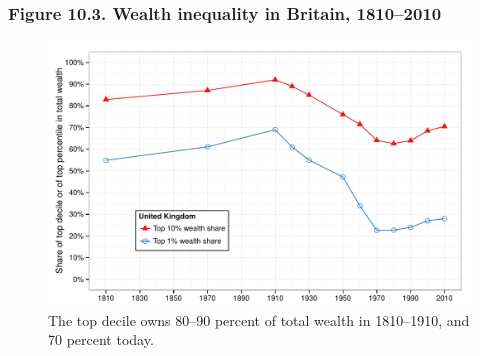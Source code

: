\documentclass[t]{beamer}\usepackage[]{graphicx}\usepackage[]{color}
\newenvironment{knitrout}{}{} %
\begin{document}
\begin{frame}[label=Figure_10_3]
\frametitle{Figure 10.3. Wealth inequality in Britain, 1810--2010}
\begin{figure}[t]
\begin{minipage}[b]{\textwidth}
\centering
\begin{knitrout}\footnotesize
{}\color{fgcolor}

{\centering \includegraphics[width=1\linewidth]{figures/color/Figure_10_3} 

}



\end{knitrout}
\caption{The top decile owns 80--90 percent of total wealth in 1810--1910, and 70 percent today.}
\end{minipage}
\end{figure}
\end{frame}
\end{document}
